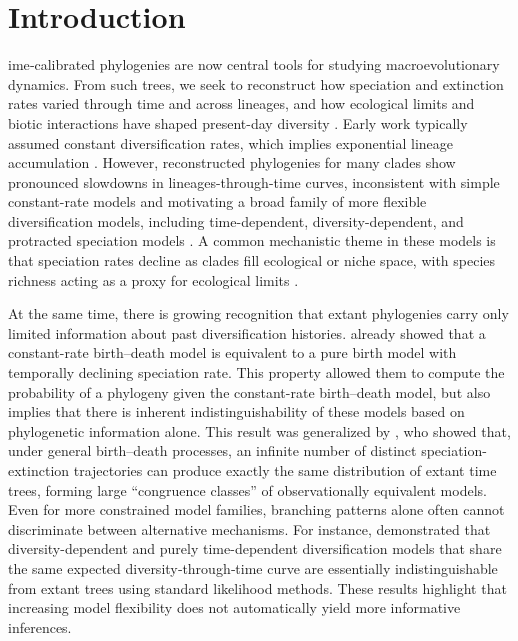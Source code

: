 \clearpage
{ %
\renewcommand{\subsectionautorefname}{Appendix}
\section{Introduction}
ime‐calibrated phylogenies are now central tools for studying macroevolutionary dynamics. From such trees, we seek to reconstruct how speciation and extinction rates varied through time and across lineages, and how ecological limits and biotic interactions have shaped present-day diversity \citep{nee_tempo_1992, quental_diversity_2010}. Early work typically assumed constant diversification rates, which implies exponential lineage accumulation \citep{nee_extinction_1994, kubo_inferring_1995}. However, reconstructed phylogenies for many clades show pronounced slowdowns in lineages-through-time curves, inconsistent with simple constant-rate models and motivating a broad family of more flexible diversification models, including time-dependent, diversity-dependent, and protracted speciation models \citep{phillimore_density-dependent_2008, moen_why_2014, etienne_diversity-dependence_2012, etienne_prolonging_2012, rosindell_protracted_2010}. A common mechanistic theme in these models is that speciation rates decline as clades fill ecological or niche space, with species richness acting as a proxy for ecological limits \citep{srivastava_phylogenetic_2012, kondratyeva_reconciling_2019}. 

At the same time, there is growing recognition that extant phylogenies carry only limited information about past diversification histories. \citet{nee_reconstructed_1994} already showed that a constant-rate birth--death model is equivalent to a pure birth model with temporally declining speciation rate. This property allowed them to compute the probability of a phylogeny given the constant-rate birth--death model, but also implies that there is inherent indistinguishability of these models based on phylogenetic information alone. This result was generalized by \citet{louca_extant_2020}, who showed that, under general birth--death processes, an infinite number of distinct speciation-extinction trajectories can produce exactly the same distribution of extant time trees, forming large “congruence classes” of observationally equivalent models. Even for more constrained model families, branching patterns alone often cannot discriminate between alternative mechanisms. For instance, \citet{pannetier_branching_2021} demonstrated that diversity-dependent and purely time-dependent diversification models that share the same expected diversity‐through‐time curve are essentially indistinguishable from extant trees using standard likelihood methods. These results highlight that increasing model flexibility does not automatically yield more informative inferences.

}
